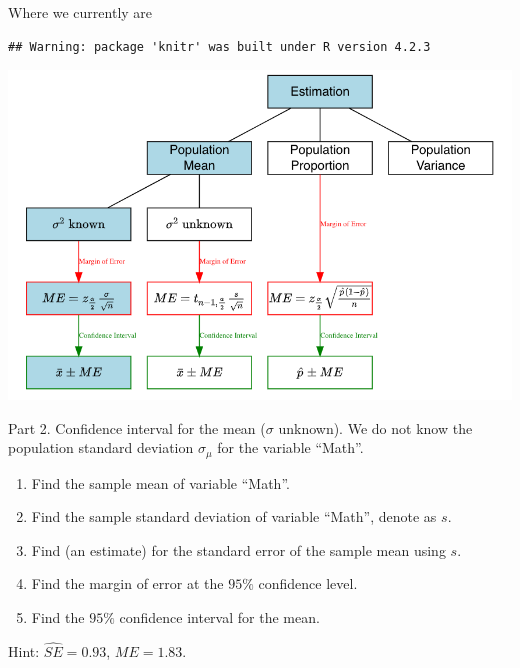 \documentclass[
  10pt,
  ignorenonframetext,
]{beamer}
\begin{document}
\begin{frame}[fragile]{Where we currently are}
\protect\hypertarget{where-we-currently-are}{}
\begin{verbatim}
## Warning: package 'knitr' was built under R version 4.2.3
\end{verbatim}

\begin{center}\includegraphics[width=0.9\linewidth]{pictures/EstimationGuide-Case1} \end{center}
\end{frame}

\begin{frame}{Part 2. Confidence interval for the mean (\(\sigma\)
unknown).}
\protect\hypertarget{part-2.-confidence-interval-for-the-mean-sigma-unknown.}{}
We do not know the population standard deviation \(\sigma_\mu\) for the
variable ``Math''.

\begin{enumerate}
\item
  Find the sample mean of variable ``Math''.
\item
  Find the sample standard deviation of variable ``Math'', denote as
  \(s\).
\item
  Find (an estimate) for the standard error of the sample mean using
  \(s\).
\item
  Find the margin of error at the \(95\%\) confidence level.
\item
  Find the \(95\%\) confidence interval for the mean.
\end{enumerate}

Hint: \(\widehat{SE}=0.93\), \(ME=1.83\).
\end{frame}
\end{document}
